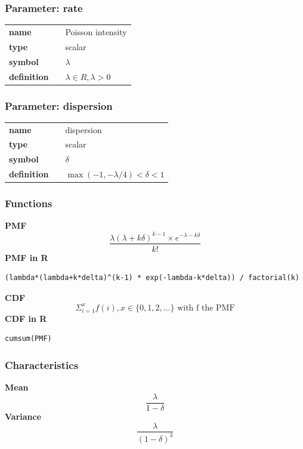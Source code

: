 \subsubsection*{Parameter: rate}

\noindent\begin{tabular}{p{2cm}cl}
\textbf{name} & & Poisson intensity \\
\textbf{type} & & scalar \\
\textbf{symbol} & & $\lambda$  \\
\textbf{definition} & & $\lambda \in R, \lambda > 0$
\end{tabular}
\subsubsection*{Parameter: dispersion}

\noindent\begin{tabular}{p{2cm}cl}
\textbf{name} & & dispersion \\
\textbf{type} & & scalar \\
\textbf{symbol} & & $\delta$  \\
\textbf{definition} & & $\max(-1,-\lambda/4) < \delta < 1$
\end{tabular}
\subsubsection*{Functions}

\smallskip \noindent \hspace{.2cm} \textbf{PMF} 
\begin{equation*}\frac{\lambda (\lambda+k\delta)^{k-1}\times e^{-\lambda - k \delta}}{k!}\end{equation*}
\smallskip \noindent \hspace{.2cm} \textbf{PMF in R}  
\begin{verbatim}(lambda*(lambda+k*delta)^(k-1) * exp(-lambda-k*delta)) / factorial(k)\end{verbatim}
\smallskip \noindent \hspace{.2cm} \textbf{CDF} 
\begin{equation*}\Sigma_{i=1}^x f(i), x \in \{0,1,2,...\}
\text { with f the PMF}\end{equation*}
\smallskip \noindent \hspace{.2cm} \textbf{CDF in R}  
\begin{verbatim}
cumsum(PMF)
\end{verbatim}
\smallskip
\subsubsection*{Characteristics}
\smallskip \noindent \hspace{.2cm} \textbf{Mean} 
\begin{equation*}\frac{\lambda}{1 -\delta}\end{equation*}
\smallskip \noindent \hspace{.2cm} \textbf{Variance} 
\begin{equation*}\frac{\lambda}{(1 -\delta)^3}\end{equation*}
\smallskip
